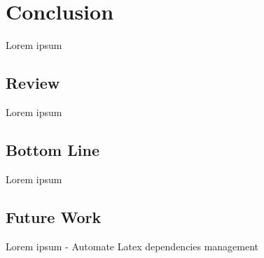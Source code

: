 \section{Conclusion}

Lorem ipsum

\subsection{Review}
Lorem ipsum

\subsection{Bottom Line}
Lorem ipsum

\subsection{Future Work}
Lorem ipsum
- Automate Latex dependencies management